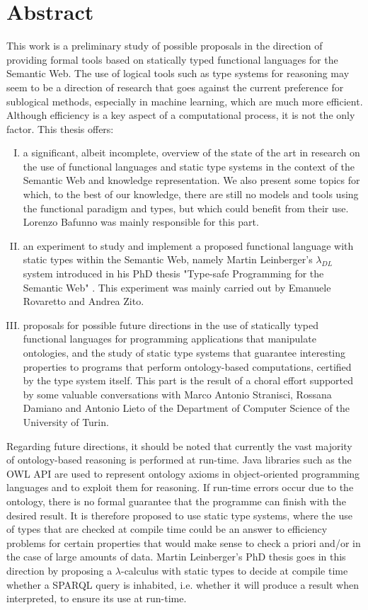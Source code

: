 \chapter{Abstract}
This work is a preliminary study of possible proposals in the direction of providing formal tools based on statically typed functional languages for the Semantic Web. The use of logical tools such as type systems for reasoning may seem to be a direction of research that goes against the current preference for sublogical methods, especially in machine learning, which are much more efficient. Although efficiency is a key aspect of a computational process, it is not the only factor.
This thesis offers:
\begin{enumerate}[I.]
	\item a significant, albeit incomplete, overview of the state of the art in research on the use of functional languages and static type systems in the context of the Semantic Web and knowledge representation. We also present some topics for which, to the best of our knowledge, there are still no models and tools using the functional paradigm and types, but which could benefit from their use. Lorenzo Bafunno was mainly responsible for this part.
	\item  an experiment to study and implement a proposed functional language with static types within the Semantic Web, namely Martin Leinberger's $\lambda_{DL}$ system introduced in his PhD thesis "Type-safe Programming for the Semantic Web" \cite{leinbergerphdthesis}. This experiment was mainly carried out by Emanuele Rovaretto and Andrea Zito.
	\item proposals for possible future directions in the use of statically typed functional languages for programming applications that manipulate ontologies, and the study of static type systems that guarantee interesting properties to programs that perform ontology-based computations, certified by the type system itself. This part is the result of a choral effort supported by some valuable conversations with Marco Antonio Stranisci, Rossana Damiano and Antonio Lieto of the Department of Computer Science of the University of Turin.
\end{enumerate}
\noindent
Regarding future directions, it should be noted that currently the vast majority of ontology-based reasoning is performed at run-time. Java libraries such as the OWL API \cite{OWLAPI} are used to represent ontology axioms in object-oriented programming languages and to exploit them for reasoning. If run-time errors occur due to the ontology, there is no formal guarantee that the programme can finish with the desired result. It is therefore proposed to use static type systems, where the use of types that are checked at compile time could be an answer to efficiency problems for certain properties that would make sense to check a priori and/or in the case of large amounts of data. Martin Leinberger's PhD thesis \cite{leinbergerphdthesis} goes in this direction by proposing a $\lambda$-calculus with static types to decide at compile time whether a SPARQL query is inhabited, i.e. whether it will produce a result when interpreted, to ensure its use at run-time.